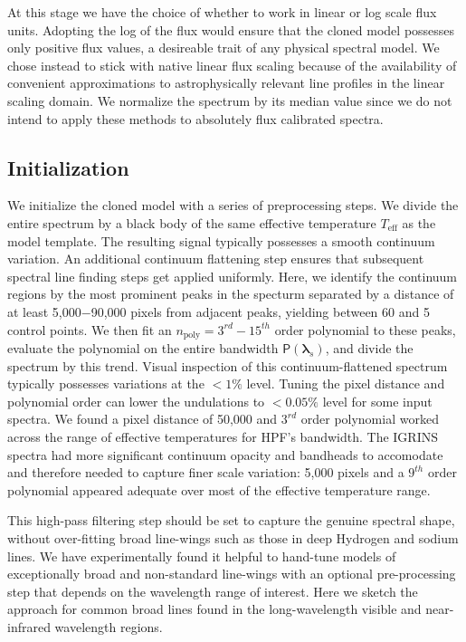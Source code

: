 \documentclass[modern]{aastex631}
\begin{document}
At this stage we have the choice of whether to work in linear or log scale flux units.  Adopting the log of the flux would ensure that the cloned model possesses only positive flux values, a desireable trait of any physical spectral model.  We chose instead to stick with native linear flux scaling because of the availability of convenient approximations to astrophysically relevant line profiles in the linear scaling domain.  We normalize the spectrum by its median value since we do not intend to apply these methods to absolutely flux calibrated spectra.

\subsection{Initialization}

We initialize the cloned model with a series of preprocessing steps.  We divide the entire spectrum by a black body of the same effective temperature $T_{\mathrm{eff}}$ as the model template.  The resulting signal typically possesses a smooth continuum variation.  An additional continuum flattening step ensures that subsequent spectral line finding steps get applied uniformly.  Here, we identify the continuum regions by the most prominent peaks in the specturm separated by a distance of at least 5,000$-$90,000 pixels from adjacent peaks, yielding between 60 and 5 control points.  We then fit an $n_{\mathrm{poly}} = 3^{rd}-15^{th}$ order polynomial to these peaks, evaluate the polynomial on the entire bandwidth $\mathsf{P}(\bm{\lambda}_s)$, and divide the spectrum by this trend.  Visual inspection of this continuum-flattened spectrum typically possesses variations at the $<1\%$ level.  Tuning the pixel distance and polynomial order can lower the undulations to $<0.05\%$ level for some input spectra.  We found a pixel distance of 50,000 and $3^{rd}$ order polynomial worked across the range of effective temperatures for HPF's bandwidth. The IGRINS spectra had more significant continuum opacity and bandheads to accomodate and therefore needed to capture finer scale variation: 5,000 pixels and a $9^{th}$ order polynomial appeared adequate over most of the effective temperature range.

This high-pass filtering step should be set to capture the genuine spectral shape, without over-fitting broad line-wings such as those in deep Hydrogen and sodium lines.  We have experimentally found it helpful to hand-tune models of exceptionally broad and non-standard line-wings with an optional pre-processing step that depends on the wavelength range of interest.  Here we sketch the approach for common broad lines found in the long-wavelength visible and near-infrared wavelength regions.
\end{document}
